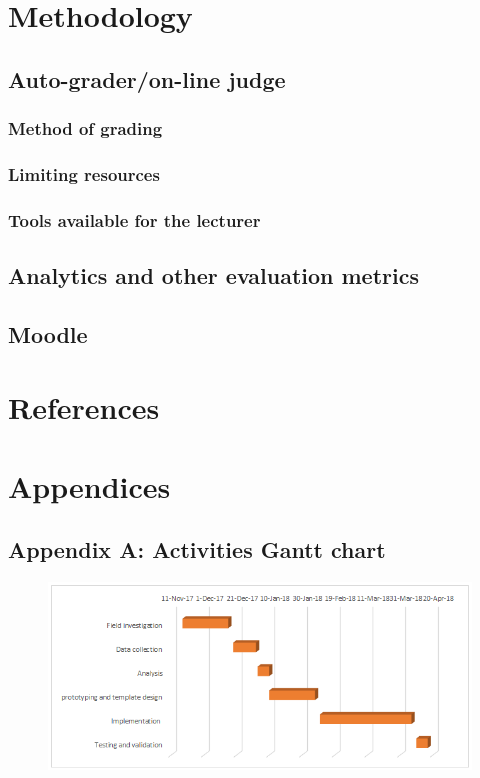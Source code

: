 \documentclass[12pt]{article}
\begin{document}
\section{Methodology}
	\subsection{Auto-grader/on-line judge}
		\subsubsection{Method of grading}
		\subsubsection{Limiting resources}
		\subsubsection{Tools available for the lecturer}
	\subsection{Analytics and other evaluation metrics}
	\subsection{Moodle}
\newpage
\section{References}
\newpage
\section{Appendices}
	\subsection{Appendix A: Activities Gantt chart}
	\begin{figure}[h]
		\begin{center} \includegraphics[width=1\linewidth]{gantt.png} \end{center}
	\end{figure}
\end{document}
